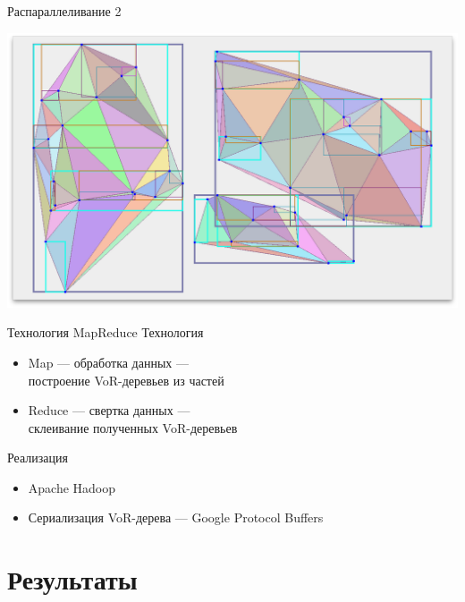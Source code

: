 \documentclass[14pt, fleqn, xcolor={dvipsnames, table}]{beamer}
\begin{document}
        \begin{frame}{Распараллеливание 2}
            \begin{center}
                \includegraphics[scale=0.295]{12.png}
            \end{center}            
        \end{frame}
        
        \begin{frame}{Технология MapReduce}
            Технология
            \begin{itemize}
                \item Map --- обработка данных --- \\ построение VoR-деревьев из частей 
                \item Reduce --- свертка данных --- \\ склеивание полученных VoR-деревьев
            \end{itemize} 
            Реализация
            \begin{itemize}
                \item Apache Hadoop
                \item Сериализация VoR-дерева --- Google Protocol Buffers
            \end{itemize}              
        \end{frame}
        
    \section{Результаты}
    
\end{document}
